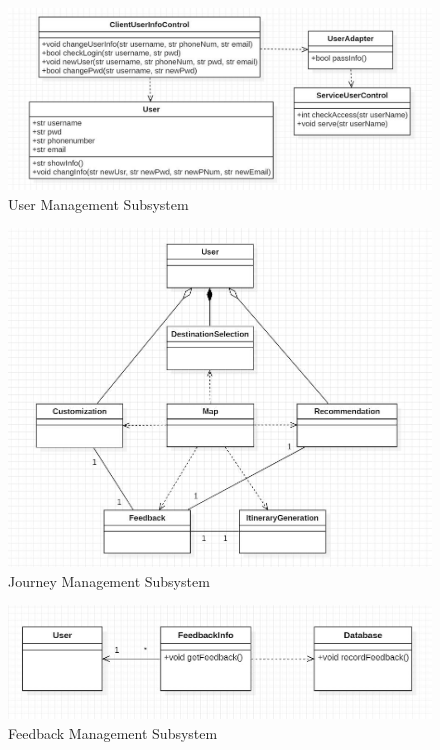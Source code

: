 \documentclass[10pt]{article}
\begin{document}
\begin{figure}[H]
    \centering
    
    \includegraphics[width=14cm]{usermanager.jpg}
    \caption{User Management Subsystem}
    \label{User Management Subsystem}
\end{figure}

\begin{figure}[H]
    \centering
    
    \includegraphics[width=14cm]{journeymanager.jpg}
    \caption{Journey Management Subsystem}
    \label{Journey Management Subsystem}
\end{figure}

\begin{figure}[H]
    \centering
    
    \includegraphics[width=14cm]{reportmanager.jpg}
    \caption{Feedback Management Subsystem}
    \label{Feedback Management Subsystem}
\end{figure}
\end{document}
